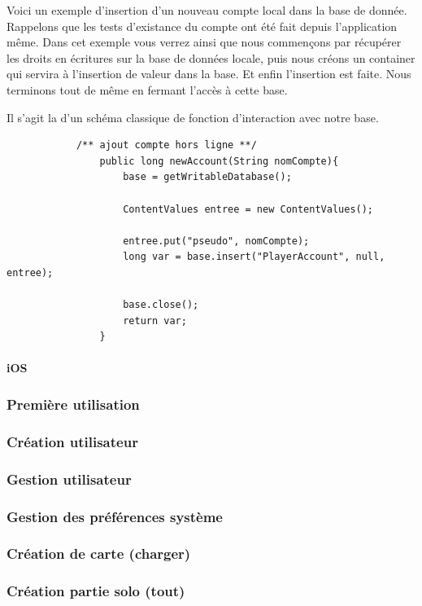 \documentclass[]{report}
\begin{document}
			Voici un exemple d'insertion d'un nouveau compte local dans la base de
			donnée. Rappelons que les tests d'existance du compte ont été fait depuis
			l'application même. Dans cet exemple vous verrez ainsi que nous commençons
			par récupérer les droits en écritures sur la base de données locale, puis
			nous créons un container qui servira à l'insertion de valeur dans la base. Et
			enfin l'insertion est faite. Nous terminons tout de même en fermant l'accès à
			cette base.
			
			Il s'agit la d'un schéma classique de fonction d'interaction avec notre
			base.
						
			\begin{verbatim}
			/** ajout compte hors ligne **/
				public long newAccount(String nomCompte){
					base = getWritableDatabase();
			
					ContentValues entree = new ContentValues();
					
					entree.put("pseudo", nomCompte);
					long var = base.insert("PlayerAccount", null, entree);
					
					base.close();
					return var;
				}
			\end{verbatim}

			
			\paragraph{iOS}
				
			\subsubsection{Première utilisation}
			\subsubsection{Création utilisateur}
			\subsubsection{Gestion utilisateur}
			\subsubsection{Gestion des préférences système}
			\subsubsection{Création de carte (charger)}
			\subsubsection{Création partie solo (tout)}
\end{document}
